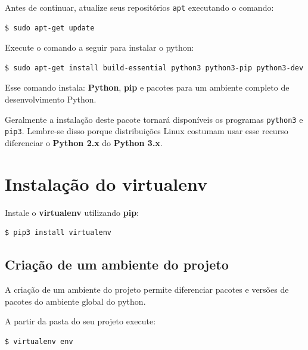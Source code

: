 \documentclass[brazil,a4paper,oneside,openright,parskip=full]{book}
\newcommand{\passthrough}[1]{#1}
\begin{document}
Antes de continuar, atualize seus repositórios
\passthrough{\lstinline!apt!} executando o comando:

\begin{lstlisting}[language=sh, style=nonumber]
$ sudo apt-get update
\end{lstlisting}

Execute o comando a seguir para instalar o python:

\begin{lstlisting}[language=sh, style=nonumber]
$ sudo apt-get install build-essential python3 python3-pip python3-dev python3-setuptools
\end{lstlisting}

Esse comando instala: \textbf{Python}, \textbf{pip} e pacotes para um
ambiente completo de desenvolvimento Python.

Geralmente a instalação deste pacote tornará disponíveis os programas
\passthrough{\lstinline!python3!} e \passthrough{\lstinline!pip3!}.
Lembre-se disso porque distribuições Linux costumam usar esse recurso
diferenciar o \textbf{Python 2.x} do \textbf{Python 3.x}.

\hypertarget{instalauxe7uxe3o-do-virtualenv}{%
\section{Instalação do
virtualenv}\label{instalauxe7uxe3o-do-virtualenv}}

Instale o \textbf{virtualenv} utilizando \textbf{pip}:

\begin{lstlisting}[language=sh, style=nonumber]
$ pip3 install virtualenv
\end{lstlisting}

\hypertarget{criauxe7uxe3o-de-um-ambiente-do-projeto}{%
\subsection{Criação de um ambiente do
projeto}\label{criauxe7uxe3o-de-um-ambiente-do-projeto}}

A criação de um ambiente do projeto permite diferenciar pacotes e
versões de pacotes do ambiente global do python.

A partir da pasta do seu projeto execute:

\begin{lstlisting}[language=sh, style=nonumber]
$ virtualenv env
\end{lstlisting}
\end{document}

